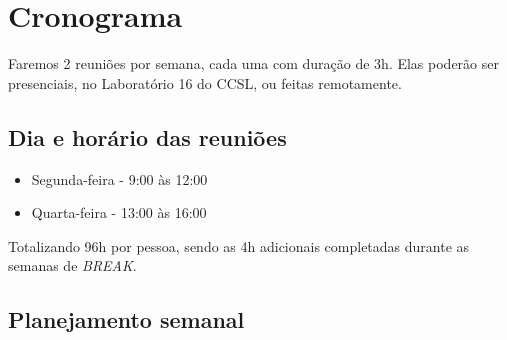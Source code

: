 \documentclass[a4paper, 11pt]{article}
\begin{document}
\section{Cronograma}
		Faremos 2 reuniões por semana, cada uma com duração de 3h. Elas poderão ser presenciais, no
Laboratório 16 do CCSL, ou feitas remotamente.
  	
  	\subsection{Dia e horário das reuniões}
  	\begin{itemize} 
  	\item Segunda-feira - 9:00 às 12:00
  	\item Quarta-feira - 13:00 às 16:00
 	\end{itemize}

 	Totalizando 96h por pessoa, sendo as 4h adicionais completadas durante as semanas de \textit{BREAK}.

\subsection{Planejamento semanal}
\end{document}
